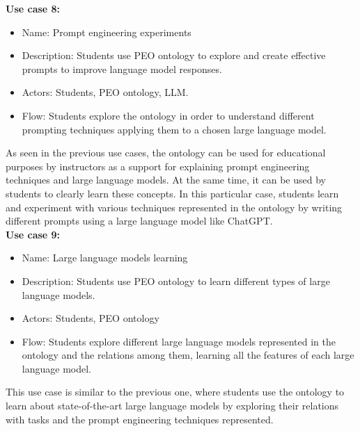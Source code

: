 \textbf{Use case 8:}
\begin{itemize}
    \item Name: Prompt engineering experiments
    \item Description: Students use PEO ontology to explore and create effective prompts to improve language model responses.
    \item Actors: Students, PEO ontology, LLM.
    \item Flow: Students explore the ontology in order to understand different prompting techniques applying them to a chosen large language model.
\end{itemize}
As seen in the previous use cases, the ontology can be used for educational purposes by instructors as a support for explaining prompt engineering techniques and large language models. At the same time, it can be used by students to clearly learn these concepts. In this particular case, students learn and experiment with various techniques represented in the ontology by writing different prompts using a large language model like ChatGPT.\\

\textbf{Use case 9:}
\begin{itemize}
    \item Name: Large language models learning
    \item Description: Students use PEO ontology to learn different types of large language models.
    \item Actors: Students, PEO ontology
    \item Flow: Students explore different large language models represented in the ontology and the relations among them, learning all the features of each large language model.
\end{itemize}
This use case is similar to the previous one, where students use the ontology to learn about state-of-the-art large language models by exploring their relations with tasks and the prompt engineering techniques represented.\\

